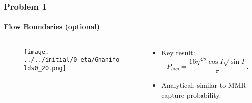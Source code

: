 \documentclass[dvipsnames, 11pt]{beamer}
\begin{document}
\begin{frame}
    \frametitle{Problem 1}
    \framesubtitle{Flow Boundaries (optional)}

    \begin{columns}
        \begin{column}{0.5\textwidth}
            \begin{figure}[t]
                \centering
                \texttt{[image: ../../initial/0\_eta/6manifolds0\_20.png]}
            \end{figure}
        \end{column}
        \begin{column}{0.5\textwidth}
            \begin{itemize}
                \item Key result:
                    \begin{equation*}
                        P_{hop} = \frac{16\eta^{3/2}\cos I \sqrt{\sin I}}{\pi}.
                    \end{equation*}

                \item Analytical, similar to MMR capture probability.
            \end{itemize}
        \end{column}
    \end{columns}
\end{frame}
\end{document}

